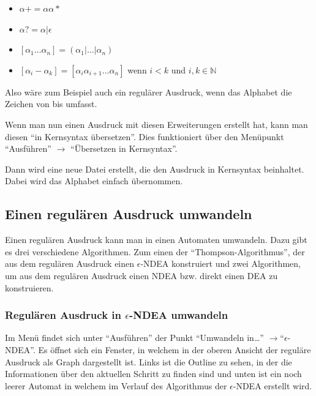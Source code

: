 \begin{itemize}
  \item $\alpha+ = \alpha \alpha*$
  \item $\alpha? = \alpha|\epsilon$
  \item $[\alpha _1\ldots\alpha _n] = (\alpha _1|\ldots|\alpha _n)$
  \item $[\alpha _i - \alpha _k] = [\alpha _i \alpha _{i+1}\ldots\alpha _n]$ wenn $i < k$ und $i,k\in{\mathbb N}$
\end{itemize}

Also wäre zum Beispiel auch \Symbol{[a-z]} ein regulärer Ausdruck, wenn das Alphabet die Zeichen von  bis  umfasst.

Wenn man nun einen Ausdruck mit diesen Erweiterungen erstellt hat, kann man diesen "`in Kernsyntax übersetzen"'. Dies funktioniert über den Menüpunkt "`Ausführen"' $\rightarrow$ "`Übersetzen in Kernsyntax"'.

Dann wird eine neue Datei erstellt, die den Ausdruck in Kernsyntax beinhaltet. Dabei wird das Alphabet einfach übernommen.

\subsection{Einen regulären Ausdruck umwandeln}

Einen regulären Ausdruck kann man in einen Automaten umwandeln. Dazu gibt es drei verschiedene Algorithmen. Zum einen der "`Thompson-Algorithmus"', der aus dem regulären Ausdruck einen $\epsilon$-NDEA konstruiert und zwei Algorithmen, um aus dem regulären Ausdruck einen NDEA bzw. direkt einen DEA zu konstruieren.

\subsubsection{Regulären Ausdruck in $\epsilon$-NDEA umwandeln}

Im Menü findet sich unter "`Ausführen"' der Punkt "`Umwandeln in\ldots"' $\rightarrow$"`$\epsilon$-NDEA"'. Es öffnet sich ein Fenster, in welchem in der oberen Ansicht der reguläre Ausdruck als Graph dargestellt ist. Links ist die Outline zu sehen, in der die Informationen über den aktuellen Schritt zu finden sind und unten ist ein noch leerer Automat in welchem im Verlauf des Algorithmus der $\epsilon$-NDEA erstellt wird.


